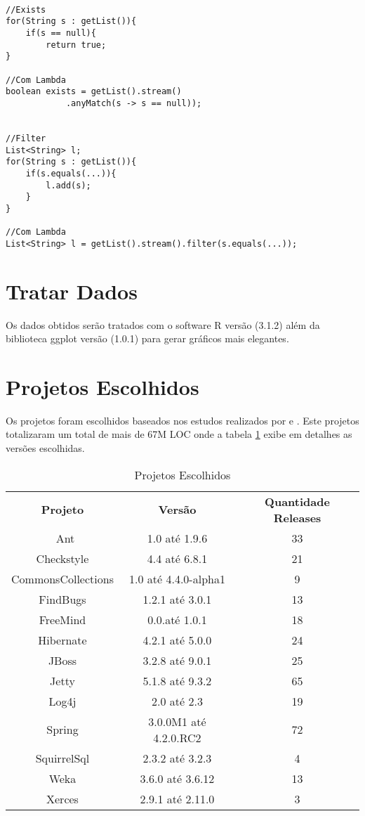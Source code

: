 \begin{lstlisting}

//Exists
for(String s : getList()){
	if(s == null){
		return true;
}

//Com Lambda
boolean exists = getList().stream()
            .anyMatch(s -> s == null));
            

//Filter
List<String> l;
for(String s : getList()){
	if(s.equals(...)){
		l.add(s);
	}
}

//Com Lambda
List<String> l = getList().stream().filter(s.equals(...));

\end{lstlisting}


\section{Tratar Dados}
Os dados obtidos serão tratados com o software R \cite{R} versão (3.1.2) além da biblioteca ggplot \cite{ggplot} versão (1.0.1) para gerar gráficos mais elegantes.


\section{Projetos Escolhidos}
Os projetos foram escolhidos baseados nos estudos realizados por \cite{Parnin:2011:JGA:1985441.1985446} e \cite{Dyer:2014:MBA:2568225.2568295}. Este projetos totalizaram um total de mais de 67M \acs{LOC} onde a tabela \ref{tab:ProjetosEscolhidos} exibe em detalhes as versões escolhidas.


\begin{table}[ht]
	\centering
	\caption{Projetos Escolhidos}
	\label{tab:ProjetosEscolhidos}
	\begin{tabular}{c|c|c}
		\hline \hline
		\textbf{Projeto}    &   \textbf{Versão} & \textbf{Quantidade Releases}\\ \
	      Ant & 1.0 até 1.9.6 & 33\\
	      Checkstyle & 4.4 até 6.8.1 & 21\\
	      CommonsCollections & 1.0 até 4.4.0-alpha1 & 9\\
	      FindBugs & 1.2.1 até 3.0.1 & 13\\
	      FreeMind & 0.0.até 1.0.1 & 18\\
	      Hibernate & 4.2.1 até 5.0.0 & 24\\
	      JBoss & 3.2.8 até 9.0.1 & 25\\
	      Jetty & 5.1.8 até 9.3.2 & 65\\
	      Log4j & 2.0 até 2.3 & 19\\
	      Spring & 3.0.0M1 até 4.2.0.RC2 & 72\\
	      SquirrelSql & 2.3.2 até 3.2.3 & 4\\
	      Weka & 3.6.0 até 3.6.12 & 13\\
	      Xerces & 2.9.1 até 2.11.0 & 3\\
	      
      \hline
    \end{tabular}
\end{table}
